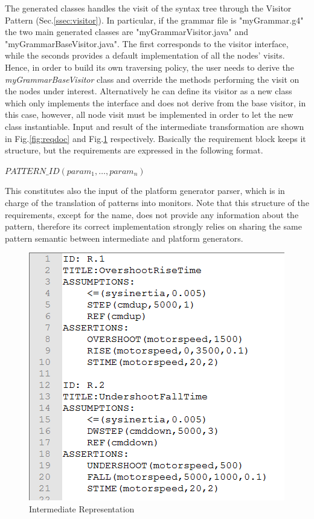 The generated classes handles the visit of the syntax tree through the Visitor Pattern (Sec.\ref{ssec:visitor}). In particular, if the grammar file is "myGrammar.g4" the two main generated classes are "myGrammarVisitor.java" and "myGrammarBaseVisitor.java". The first corresponds to the visitor interface, while the seconds provides a default implementation of all the nodes' visits. Hence, in order to build its own traversing policy, the user needs to derive the \textit{myGrammarBaseVisitor} class and override the methods performing the visit on the nodes under interest. Alternatively he can define its visitor as a new class which only implements the interface and does not derive from the base visitor, in this case, however, all node visit must be implemented in order to let the new class instantiable.
Input and result of the intermediate transformation are shown in Fig.\ref{fig:reqdoc} and Fig.\ref{fig:intermrepr} respectively. Basically the requirement block keeps it structure, but the requirements are expressed in the following format.
\begin{center}
$PATTERN\_ID(param_1,\dots,param_n)$
\end{center}
This constitutes also the input of the platform generator parser, which is in charge of the translation of patterns into monitors. Note that this structure of the requirements, except for the name, does not provide any information about the pattern, therefore its correct implementation strongly relies on sharing the same pattern semantic between intermediate and platform generators.

\begin{figure}[h]
\centering
\includegraphics[width=.6\textwidth]{Figs/intermrep.PNG}
\caption{Intermediate Representation}
\label{fig:intermrepr}
\end{figure}

